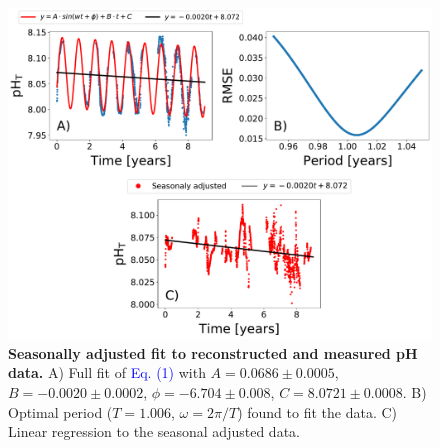 \begin{figure}[H]
    \centering
    \includegraphics[width=\textwidth]{Figures/Trend_seasonality_pH.pdf}
    \caption[Seasonally adjusted fit to reconstructed and measured pH
        data]{\textbf{Seasonally adjusted fit to reconstructed and measured pH
            data.}
        A) Full fit of \textcolor{blue}{Eq. (1)} with $A=0.0686 \pm 0.0005$,
        $B=-0.0020
            \pm 0.0002$, $\phi=-6.704 \pm 0.008$,  $C=8.0721 \pm 0.0008$. B)
        Optimal period
        ($T=1.006$, $\omega=2\pi/T$) found to fit the data. C) Linear
        regression to the
        seasonal adjusted data. }
    \label{fig:seasonally_adjusted_fit_pH}
\end{figure}

